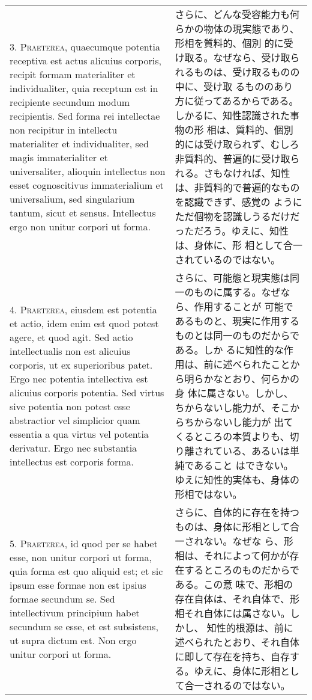 \documentclass[paper=a4paper,fontsize=10pt,jafontsize=9pt,titlepage]{jlreq}
\begin{document}
\begin{longtable}{p{21em}p{21em}}
3. {\scshape Praeterea}, quaecumque potentia receptiva est actus
alicuius corporis, recipit formam materialiter et individualiter, quia
receptum est in recipiente secundum modum recipientis. Sed forma rei
intellectae non recipitur in intellectu materialiter et
individualiter, sed magis immaterialiter et universaliter, alioquin
intellectus non esset cognoscitivus immaterialium et universalium, sed
singularium tantum, sicut et sensus. Intellectus ergo non unitur
corpori ut forma.
 
&

さらに、どんな受容能力も何らかの物体の現実態であり、形相を質料的、個別
的に受け取る。なぜなら、受け取られるものは、受け取るものの中に、受け取
るもののあり方に従ってあるからである。しかるに、知性認識された事物の形
相は、質料的、個別的には受け取られず、むしろ非質料的、普遍的に受け取ら
れる。さもなければ、知性は、非質料的で普遍的なものを認識できず、感覚の
ようにただ個物を認識しうるだけだっただろう。ゆえに、知性は、身体に、形
相として合一されているのではない。
 
\\

4. {\scshape Praeterea}, eiusdem est potentia et actio, idem enim est
quod potest agere, et quod agit. Sed actio intellectualis non est
alicuius corporis, ut ex superioribus patet. Ergo nec potentia
intellectiva est alicuius corporis potentia. Sed virtus sive potentia
non potest esse abstractior vel simplicior quam essentia a qua virtus
vel potentia derivatur. Ergo nec substantia intellectus est corporis
forma.
 
&

 さらに、可能態と現実態は同一のものに属する。なぜなら、作用することが
 可能であるものと、現実に作用するものとは同一のものだからである。しか
 るに知性的な作用は、前に述べられたことから明らかなとおり、何らかの身
 体に属さない。しかし、ちからないし能力が、そこからちからないし能力が
 出てくるところの本質よりも、切り離されている、あるいは単純であること
 はできない。ゆえに知性的実体も、身体の形相ではない。
 
\\

5. {\scshape Praeterea}, id quod per se habet esse, non unitur corpori
ut forma, quia forma est quo aliquid est; et sic ipsum esse formae non
est ipsius formae secundum se. Sed intellectivum principium habet
secundum se esse, et est subsistens, ut supra dictum est. Non ergo
unitur corpori ut forma.
 
&

さらに、自体的に存在を持つものは、身体に形相として合一されない。なぜな
ら、形相は、それによって何かが存在するところのものだからである。この意
味で、形相の存在自体は、それ自体で、形相それ自体には属さない。しかし、
知性的根源は、前に述べられたとおり、それ自体に即して存在を持ち、自存す
る。ゆえに、身体に形相として合一されるのではない。
 

\end{longtable}
\end{document}
